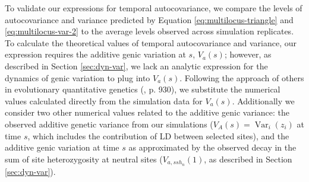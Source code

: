 \documentclass[11pt]{article}
\DeclareMathOperator{\var}{Var}
\begin{document}
To validate our expressions for temporal autocovariance, we compare the levels
of autocovariance and variance predicted by Equation
\eqref{eq:multilocus-triangle} and \eqref{eq:multilocus-var-2} to the average
levels observed across simulation replicates. To calculate the theoretical values
of temporal autocovariance and variance, our expression requires the additive
genic variation at $s$, $V_a(s)$; however, as described in Section
\ref{sec:dyn-var}, we lack an analytic expression for the dynamics of genic
variation to plug into $V_a(s)$.  Following the approach of others in
evolutionary quantitative genetics (\cite{Turelli1994-rd}, p. 930), we
substitute the numerical values calculated directly from the simulation data
for $V_a(s)$. Additionally we consider two other numerical values related to
the additive genic variance: the observed additive genetic variance from our
simulations ($V_A(s) = \var_i(z_i)$ at time $s$, which includes the
contribution of LD between selected sites), and the additive genic variation at
time $s$ as approximated by the observed decay in the sum of site
heterozygosity at neutral sites ($V_{a,ssh_n}(1)$, as described in Section
\ref{sec:dyn-var}). 
\end{document}
